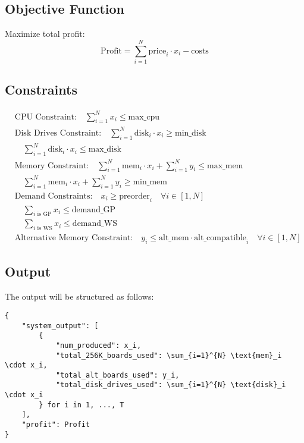 \documentclass{article}
\begin{document}
\subsection*{Objective Function}
Maximize total profit:
\[
\text{Profit} = \sum_{i=1}^{N} \text{price}_i \cdot x_i - \text{costs}
\]

\subsection*{Constraints}

\begin{align}
    & \text{CPU Constraint:} \quad \sum_{i=1}^{N} x_i \leq \text{max\_cpu} \\
    & \text{Disk Drives Constraint:} \quad \sum_{i=1}^{N} \text{disk}_i \cdot x_i \geq \text{min\_disk} \\
    & \quad \sum_{i=1}^{N} \text{disk}_i \cdot x_i \leq \text{max\_disk} \\
    & \text{Memory Constraint:} \quad \sum_{i=1}^{N} \text{mem}_i \cdot x_i + \sum_{i=1}^{N} y_i \leq \text{max\_mem} \\
    & \quad \sum_{i=1}^{N} \text{mem}_i \cdot x_i + \sum_{i=1}^{N} y_i \geq \text{min\_mem} \\
    & \text{Demand Constraints:} \quad x_i \geq \text{preorder}_i \quad \forall i \in [1, N] \\
    & \quad \sum_{i \text{ is GP}} x_i \leq \text{demand\_GP} \\
    & \quad \sum_{i \text{ is WS}} x_i \leq \text{demand\_WS} \\
    & \text{Alternative Memory Constraint:} \quad y_i \leq \text{alt\_mem} \cdot \text{alt\_compatible}_i \quad \forall i \in [1, N]
\end{align}

\subsection*{Output}
The output will be structured as follows:
\begin{verbatim}
{
    "system_output": [
        {
            "num_produced": x_i,
            "total_256K_boards_used": \sum_{i=1}^{N} \text{mem}_i \cdot x_i,
            "total_alt_boards_used": y_i,
            "total_disk_drives_used": \sum_{i=1}^{N} \text{disk}_i \cdot x_i
        } for i in 1, ..., T
    ],
    "profit": Profit
}
\end{verbatim}
\end{document}
